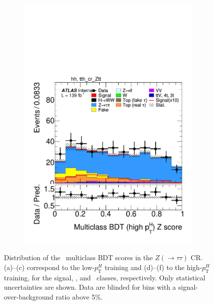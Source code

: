 \begin{figure}[h]
\begin{subfigure}[b]{0.32\textwidth}
    \includegraphics[width=\textwidth]{images/sr_cr_plots/plot_tth_Z_multiclass_gt200_hh_tth_cr_Ztt.pdf}
    \caption{}
  \end{subfigure}

  \caption{Distribution of the \ttH\ multiclass BDT scores in the $Z(\to\tau\tau)$ CR.  
  (a)–(c) correspond to the low-$p_{\mathrm{T}}^H$ training and (d)–(f) to the high-$p_{\mathrm{T}}^H$ training,  
  for the signal, \ttbar, and \ztautau\ classes, respectively. Only statistical uncertainties are shown.  
  Data are blinded for bins with a signal-over-background ratio above 5\%.}
  \label{fig:bdt_ztt}
\end{figure}


